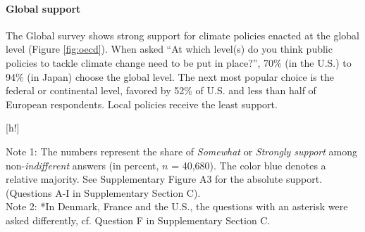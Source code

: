 \documentclass{nature}
\makeatletter
\renewenvironment*{figure}{\@float{figure}}{\end@float}
\makeatother
\begin{document}
\paragraph{Global support}\label{subsubsec:global_support} %

The Global survey shows strong support for climate policies enacted at the global level (Figure \ref{fig:oecd}). %
When asked ``At which level(s) do you think public policies to tackle climate change need to be put in place?'', 70\% (in the U.S.) to 94\% (in Japan) choose the global level. The next most popular choice is the federal or continental level, favored by 52\% of U.S. and less than half of European respondents. Local policies receive the least support. 


\begin{figure}[h!]
  \caption[Relative support for global climate policies]{Relative support for global climate policies.} 
  \label{fig:oecd} %
  {\footnotesize %
  Note 1: The numbers represent the share of \textit{Somewhat} or \textit{Strongly support} among non-\textit{indifferent} answers (in percent, $n$ = 40,680). The color blue denotes a relative majority. See Supplementary Figure A3 for the absolute support. (Questions A-I in Supplementary Section C).
  \\ Note 2: *In Denmark, France and the U.S., the questions with an asterisk were asked differently, cf. Question F in Supplementary Section C.%
  } 
\end{figure}
\end{document}
